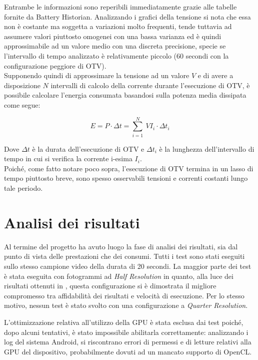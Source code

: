 Entrambe le informazioni sono reperibili immediatamente grazie alle tabelle fornite da Battery Historian.
Analizzando i grafici della tensione si nota che essa non è costante ma soggetta a variazioni molto frequenti, 
tende tuttavia ad assumere valori piuttosto omogenei con una bassa varianza ed è quindi approssimabile ad un valore medio
con una discreta precisione, specie se l'intervallo di tempo analizzato è relativamente piccolo (60 secondi con la configurazione
peggiore di OTV).\\
Supponendo quindi di approssimare la tensione ad un valore $V$ e di avere a disposizione $N$ intervalli di calcolo della
corrente durante l'esecuzione di OTV, è possibile calcolare l'energia consumata basandosi sulla potenza media dissipata come segue:

\begin{equation*}
    E = P \cdot \Delta t = \sum_{i = 1}^{N}~V I_i \cdot \Delta t_i
\end{equation*}

Dove $\Delta t$ è la durata dell'esecuzione di OTV e $\Delta t_i$ è la lunghezza dell'intervallo di tempo in cui
si verifica la corrente i-esima $I_i$.\\
Poiché, come fatto notare poco sopra, l'esecuzione di OTV termina in un lasso di tempo piuttosto breve, sono spesso osservabili
tensioni e correnti costanti lungo tale periodo.

\section{Analisi dei risultati}

Al termine del progetto ha avuto luogo la fase di analisi dei risultati, sia dal punto di vista delle prestazioni che dei 
consumi. Tutti i test sono stati eseguiti sullo stesso campione video della durata di 20 secondi. La maggior parte dei test
è stata eseguita con fotogrammi ad \textit{Half Resolution} in quanto, alla luce dei risultati ottenuti in \cite{app11157027},
questa configurazione si è dimostrata il migliore compromesso tra affidabilità dei risultati e velocità di esecuzione. Per lo
stesso motivo, nessun test è stato svolto con una configurazione a \textit{Quarter Resolution}.

L'ottimizzazione relativa all'utilizzo della GPU è stata esclusa dai test poiché, dopo alcuni tentativi, è stato impossibile
abilitarla correttamente: analizzando i log del sistema Android, si riscontrano errori di permessi e di letture relativi alla
GPU del dispositivo, probabilmente dovuti ad un mancato supporto di OpenCL.

